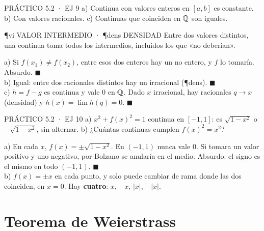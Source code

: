 \begin{enunciado}{PRÁCTICO 5.2 · EJ 9}
a) Continua con valores enteros en $[a,b]$ es constante. b) Con valores racionales. c) Continuas que coinciden en $\mathbb{Q}$ son iguales.
\end{enunciado}
\begin{uso}{\P{vi} VALOR INTERMEDIO · \P{dens} DENSIDAD}
Entre dos valores distintos, una continua toma todos los intermedios, incluidos los que «no deberían».
\end{uso}
a) Si $f(x_1)\neq f(x_2)$, entre esos dos enteros hay un no entero, y $f$ lo tomaría. Absurdo. $\blacksquare$\\
b) Igual: entre dos racionales distintos hay un irracional (\P{dens}). $\blacksquare$\\
c) $h=f-g$ es continua y vale 0 en $\mathbb{Q}$. Dado $x$ irracional, hay racionales $q\to x$ (densidad) y $h(x)=\lim h(q)=0$. $\blacksquare$

\begin{enunciado}{PRÁCTICO 5.2 · EJ 10}
a) $x^2+f(x)^2=1$ continua en $[-1,1]$: es $\sqrt{1-x^2}$ o $-\sqrt{1-x^2}$, sin alternar. b) ¿Cuántas continuas cumplen $f(x)^2=x^2$?
\end{enunciado}
a) En cada $x$, $f(x)=\pm\sqrt{1-x^2}$. En $(-1,1)$ nunca vale 0. Si tomara un valor positivo y uno negativo, por Bolzano se anularía en el medio. Absurdo: el signo es el mismo en todo $(-1,1)$. $\blacksquare$\\
b) $f(x)=\pm x$ en cada punto, y solo puede cambiar de rama donde las dos coinciden, en $x=0$. Hay \textbf{cuatro}: $x$, $-x$, $|x|$, $-|x|$.

\section{Teorema de Weierstrass}


